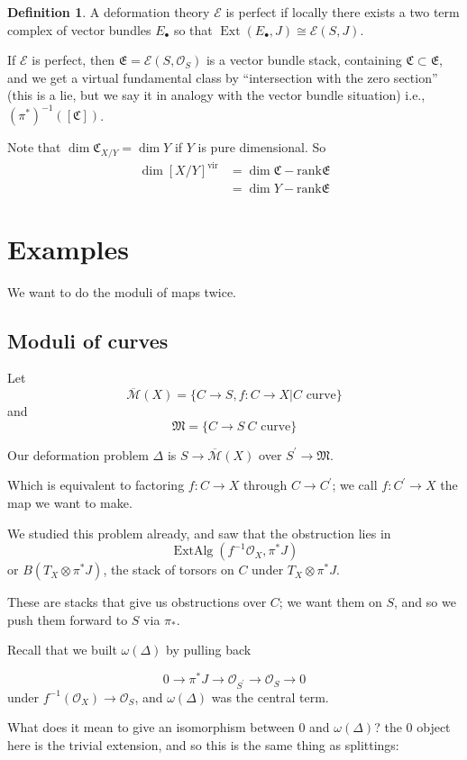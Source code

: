 \documentclass{amsart}
\theoremstyle{definition}
\newtheorem{definition}[dummy]{Definition}
\DeclareMathOperator{\ExtAlg}{ExtAlg}
\DeclareMathOperator{\Ext}{Ext}
\newcommand{\OO}{\mathcal{O}}
\newcommand{\Mbar}{\overline{\mathcal{M}}}
\newcommand{\vir}{\text{vir}}
\begin{document}
\begin{definition}
A deformation theory $\mathcal{E}$ is perfect if locally there exists a two term complex of vector bundles $E_\bullet$ so that $\Ext(E_\bullet, J)\cong\mathcal{E}(S, J)$.
\end{definition}
If $\mathcal{E}$ is perfect, then $\mathfrak{E}=\mathcal{E}(S, \OO_S)$ is a vector bundle stack, containing $\mathfrak{C}\subset\mathfrak{E}$, and we get a virtual fundamental class by ``intersection with the zero section'' (this is a lie, but we say it in analogy with the vector bundle situation) i.e., $(\pi^*)^{-1}([\mathfrak{C}])$.

Note that $\dim \mathfrak{C}_{X/Y}=\dim Y$ if $Y$ is pure dimensional.  
So
\begin{align*}
\dim [X/Y]^\vir&=\dim\mathfrak{C}-\text{rank}\mathfrak{E} \\
&= \dim Y-\text{rank}\mathfrak{E}
\end{align*}

\section{Examples}
We want to do the moduli of maps twice.  

\subsection{Moduli of curves}
Let
$$\Mbar(X)=\{C\to S, f:C\to X | C \text{ curve}\}$$
and
$$\mathfrak{M}=\{C\to S \ C \text{ curve}\}$$

Our deformation problem $\Delta$ is $S\to\Mbar(X)$ over $S^\prime\to\mathfrak{M}$.

Which is equivalent to factoring $f:C\to X$ through $C\to C^\prime$; we call $f:C^\prime\to X$ the map we want to make.

We studied this problem already, and saw that the obstruction lies in
$$\ExtAlg(f^{-1}\OO_X,\pi^*J)$$ or
$B(T_X\otimes\pi^*J)$, the stack of torsors on $C$ under $T_X\otimes\pi^*J$.

These are stacks that give us obstructions over $C$; we want them on $S$, and so we push them forward to $S$ via $\pi_*$.

Recall that we built $\omega(\Delta)$ by pulling back

$$0\to\pi^*J\to\OO_{S^\prime}\to\OO_S\to 0$$ under $f^{-1}(\OO_X)\to \OO_S$, and $\omega(\Delta)$ was the central term.

What does it mean to give an isomorphism between $0$ and $\omega(\Delta)$?  the 0 object here is the trivial extension, and so this is the same thing as splittings:
\end{document}

